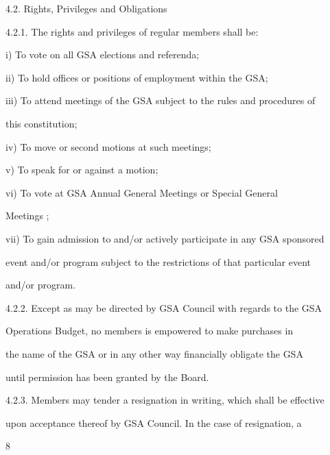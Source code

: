   



4.2.                Rights, Privileges and Obligations  



4.2.1. The rights and privileges of regular members shall be:  



i)      To vote on all GSA elections and referenda;  



ii)     To hold offices or positions of employment within the GSA;  



iii)    To attend meetings of the GSA subject to the rules and procedures of  

        this constitution;  



iv)     To move or second motions at such meetings;  



v)      To speak for or against a motion;  



vi)     To   vote   at   GSA   Annual   General   Meetings   or   Special   General  

        Meetings ;  



vii)    To gain admission to and/or actively participate in any GSA sponsored  

        event and/or program subject to the restrictions of that particular event  

        and/or program.  



4.2.2. Except as may be directed by GSA Council  with regards to the GSA  

        Operations Budget, no  members is empowered to make purchases in  

        the name of the GSA or in any other way financially obligate the GSA  

        until permission has been granted by the Board.  



4.2.3. Members may tender a resignation in writing, which  shall be effective  

        upon acceptance thereof by GSA Council. In the case of resignation, a  

                                                 

                                              8  



